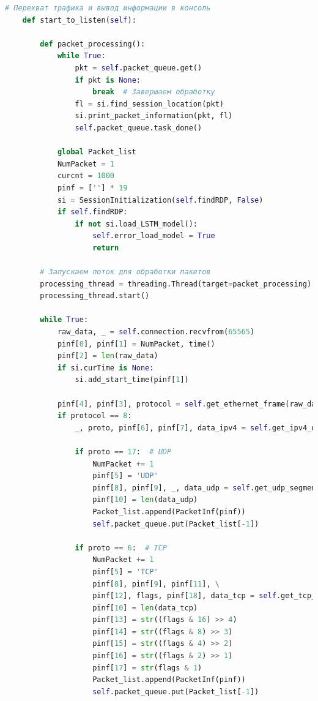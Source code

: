 \documentclass[spec, och, diploma]{SCWorks}
\begin{document}
\begin{lstlisting}[language=Python]
    # Перехват трафика и вывод информации в консоль
    def start_to_listen(self):
        
        def packet_processing():
            while True:
                pkt = self.packet_queue.get()
                if pkt is None:
                    break  # Завершаем обработку
                fl = si.find_session_location(pkt)
                si.print_packet_information(pkt, fl)
                self.packet_queue.task_done()

            global Packet_list
            NumPacket = 1
            curcnt = 1000
            pinf = [''] * 19
            si = SessionInitialization(self.findRDP, False)
            if self.findRDP:
                if not si.load_LSTM_model():
                    self.error_load_model = True
                    return

        # Запускаем поток для обработки пакетов
        processing_thread = threading.Thread(target=packet_processing)
        processing_thread.start()

        while True:
            raw_data, _ = self.connection.recvfrom(65565)
            pinf[0], pinf[1] = NumPacket, time()
            pinf[2] = len(raw_data)
            if si.curTime is None:
                si.add_start_time(pinf[1])

            pinf[4], pinf[3], protocol = self.get_ethernet_frame(raw_data)
            if protocol == 8:
                _, proto, pinf[6], pinf[7], data_ipv4 = self.get_ipv4_data(raw_data[14:])

                if proto == 17:  # UDP
                    NumPacket += 1
                    pinf[5] = 'UDP'
                    pinf[8], pinf[9], _, data_udp = self.get_udp_segment(data_ipv4)
                    pinf[10] = len(data_udp)
                    Packet_list.append(PacketInf(pinf))
                    self.packet_queue.put(Packet_list[-1])

                if proto == 6:  # TCP
                    NumPacket += 1
                    pinf[5] = 'TCP'
                    pinf[8], pinf[9], pinf[11], \
                    pinf[12], flags, pinf[18], data_tcp = self.get_tcp_segment(data_ipv4)
                    pinf[10] = len(data_tcp)
                    pinf[13] = str((flags & 16) >> 4)
                    pinf[14] = str((flags & 8) >> 3)
                    pinf[15] = str((flags & 4) >> 2)
                    pinf[16] = str((flags & 2) >> 1)
                    pinf[17] = str(flags & 1)
                    Packet_list.append(PacketInf(pinf))
                    self.packet_queue.put(Packet_list[-1])


\end{lstlisting}
\end{document}
